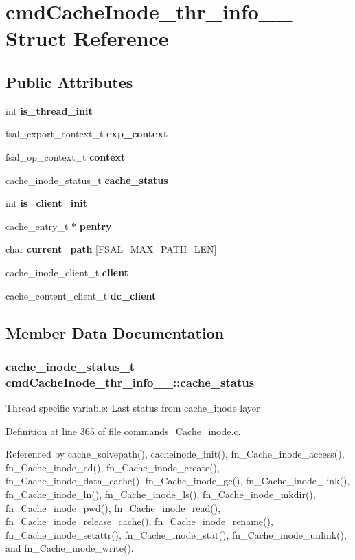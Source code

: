 \section{cmd\-Cache\-Inode\_\-thr\_\-info\_\-\_\- Struct Reference}
\label{structcmdCacheInode__thr__info____}
\subsection*{Public Attributes}
\begin{CompactItemize}
\item 
int {\bf is\_\-thread\_\-init}
\item 
fsal\_\-export\_\-context\_\-t {\bf exp\_\-context}
\item 
fsal\_\-op\_\-context\_\-t {\bf context}
\item 
cache\_\-inode\_\-status\_\-t {\bf cache\_\-status}
\item 
int {\bf is\_\-client\_\-init}
\item 
cache\_\-entry\_\-t $\ast$ {\bf pentry}
\item 
char {\bf current\_\-path} [FSAL\_\-MAX\_\-PATH\_\-LEN]
\item 
cache\_\-inode\_\-client\_\-t {\bf client}
\item 
cache\_\-content\_\-client\_\-t {\bf dc\_\-client}
\end{CompactItemize}


\subsection{Member Data Documentation}
\subsubsection{\setlength{\rightskip}{0pt plus 5cm}cache\_\-inode\_\-status\_\-t {\bf cmd\-Cache\-Inode\_\-thr\_\-info\_\-\_\-::cache\_\-status}}\label{structcmdCacheInode__thr__info_____o3}


Thread specific variable: Last status from cache\_\-inode layer 

Definition at line 365 of file commands\_\-Cache\_\-inode.c.

Referenced by cache\_\-solvepath(), cacheinode\_\-init(), fn\_\-Cache\_\-inode\_\-access(), fn\_\-Cache\_\-inode\_\-cd(), fn\_\-Cache\_\-inode\_\-create(), fn\_\-Cache\_\-inode\_\-data\_\-cache(), fn\_\-Cache\_\-inode\_\-gc(), fn\_\-Cache\_\-inode\_\-link(), fn\_\-Cache\_\-inode\_\-ln(), fn\_\-Cache\_\-inode\_\-ls(), fn\_\-Cache\_\-inode\_\-mkdir(), fn\_\-Cache\_\-inode\_\-pwd(), fn\_\-Cache\_\-inode\_\-read(), fn\_\-Cache\_\-inode\_\-release\_\-cache(), fn\_\-Cache\_\-inode\_\-rename(), fn\_\-Cache\_\-inode\_\-setattr(), fn\_\-Cache\_\-inode\_\-stat(), fn\_\-Cache\_\-inode\_\-unlink(), and fn\_\-Cache\_\-inode\_\-write().
